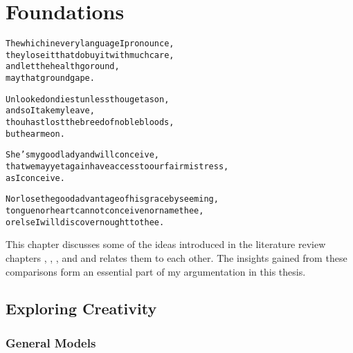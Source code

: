 
\chapter{Foundations}
\label{ch:foundations}

\startcontents[chapters]

\vfill

\begin{alltt}\sffamily
The which in every language I pronounce,
they lose it that do buy it with much care,
and let the health go round,
may that ground gape.

Unlooked on diest unless thou get a son,
and so I take my leave,
thou hast lost the breed of noble bloods,
but hear me on.

She's my good lady and will conceive,  
that we may yet again have access to our fair mistress,
as I conceive.

Nor lose the good advantage of his grace by seeming,
tongue nor heart cannot conceive nor name thee,
or else I will discover nought to thee.
\end{alltt}

\newpage
\minicontents
\spirals



This chapter discusses some of the ideas introduced in the literature review chapters , , , and  and relates them to each other. The insights gained from these comparisons form an essential part of my argumentation in this thesis.


\section{Exploring Creativity}



\subsection{General Models}
\label{s:models}


